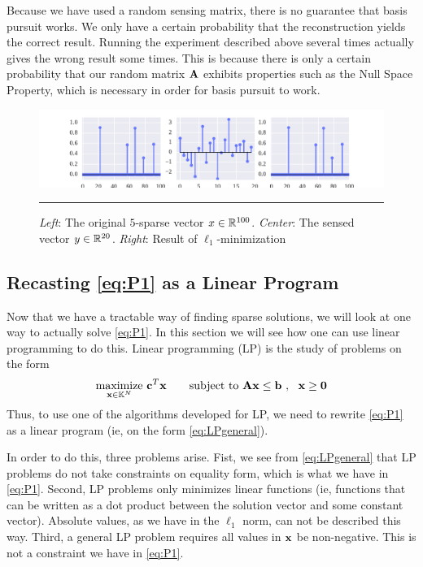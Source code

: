 Because we have used a random sensing matrix, there is no guarantee that basis pursuit works. We only have a certain probability that the reconstruction yields the correct result. Running the experiment described above several times actually gives the wrong result some times. This is because there is only a certain probability that our random matrix $ \mathbf{A} $ exhibits properties such as the Null Space Property, which is necessary in order for basis pursuit to work. 

\begin{figure}[bt]
	\centering
	\includegraphics[width=\textwidth]{figs/figure_1h.pdf}
	\caption{\textit{Left}: The original $ 5 $-sparse vector $ x \in \mathbb{R}^{100} $. \textit{Center}: The sensed vector $ y \in \mathbb{R}^{20} $. \textit{Right}: Result of $ \ell_{1} $-minimization}
	\label{fig:l1min}
	\vspace{4pt}\hrule
\end{figure}





\subsection{Recasting \eqref{eq:P1} as a Linear Program} \label{sec:basisasLP}
Now that we have a tractable way of finding sparse solutions, we will look at one way to actually solve \eqref{eq:P1}. In this section we will see how one can use linear programming to do this. Linear programming (LP) is the study of problems on the form
\begin{equation}
	\underset{\mathbf{x}\in\mathbb{K}^{N}}{\text{maximize}}~ \mathbf{c}^{T}\mathbf{x} \quad \quad\text{subject to}~ \mathbf{A}\mathbf{x}\leq\mathbf{b}~,~~ \mathbf{x}\geq\mathbf{0}
	\label{eq:LPgeneral}
\end{equation}
Thus, to use one of the algorithms developed for LP, we need to rewrite \eqref{eq:P1} as a linear program (ie, on the form \eqref{eq:LPgeneral}). 

In order to do this, three problems arise. Fist, we see from \cref{eq:LPgeneral} that LP problems do not take constraints on equality form, which is what we have in \eqref{eq:P1}. Second, LP problems only minimizes linear functions (ie, functions that can be written as a dot product between the solution vector and some constant vector). Absolute values, as we have in the $ \ell_{1} $ norm, can not be described this way. Third, a general LP problem requires all values in $ \mathbf{x} $ be non-negative. This is not a constraint we have in \eqref{eq:P1}.

